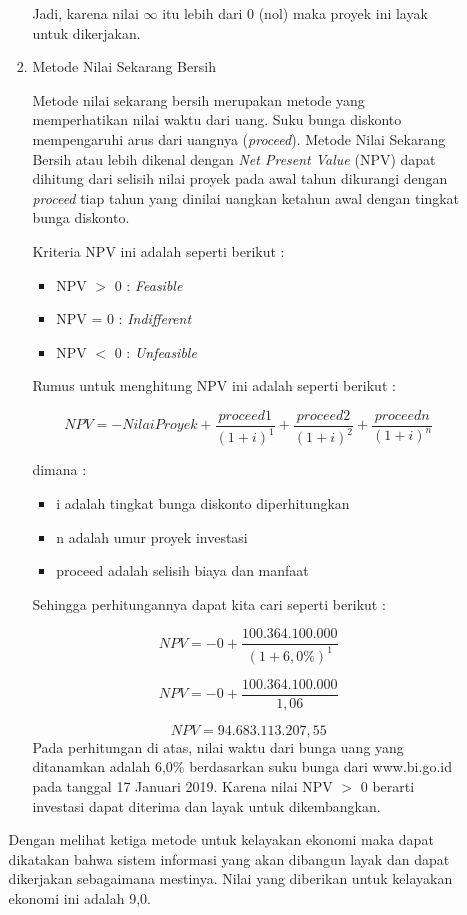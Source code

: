 \documentclass[pdftex,12pt, oneside]{article}
\begin{document}
\begin{enumerate}
\begin{enumerate}
\begin{enumerate}
Jadi, karena nilai $ \infty $ itu lebih dari 0 (nol) maka proyek ini layak untuk dikerjakan.
	
	\item Metode Nilai Sekarang Bersih
	
Metode nilai sekarang bersih merupakan metode yang memperhatikan nilai waktu dari uang. Suku bunga diskonto mempengaruhi arus dari uangnya (\textit{proceed}). Metode Nilai Sekarang Bersih atau lebih dikenal dengan \textit{Net Present Value} (NPV) dapat dihitung dari selisih nilai proyek pada awal tahun dikurangi dengan \textit{proceed} tiap tahun yang dinilai uangkan ketahun awal dengan tingkat bunga diskonto.

Kriteria NPV ini adalah seperti berikut :

\begin{itemize}
	\item NPV $>$ 0 : \textit{Feasible}
	\item NPV = 0 : \textit{Indifferent}
	\item NPV $<$ 0 : \textit{Unfeasible}
\end{itemize}

Rumus untuk menghitung NPV ini adalah seperti berikut :

\[ NPV = - NilaiProyek + \frac{proceed1}{(1 + i)^1} + \frac{proceed2}{(1 + i)^2} + \frac{proceedn}{(1 + i)^n} \]

dimana :

\begin{itemize}
	\item i adalah tingkat bunga diskonto diperhitungkan
	\item n adalah umur proyek investasi
	\item proceed adalah selisih biaya dan manfaat
\end{itemize}

Sehingga perhitungannya dapat kita cari seperti berikut :

\[ NPV = - 0 + \frac{100.364.100.000}{(1 + 6,0\%)^1} \]

\[ NPV = - 0 + \frac{100.364.100.000}{1,06} \]

\[ NPV =  94.683.113.207,55 \]
Pada perhitungan di atas, nilai waktu dari bunga uang yang ditanamkan adalah 6,0\% berdasarkan suku bunga dari www.bi.go.id pada tanggal 17 Januari 2019. Karena nilai NPV $>$ 0 berarti investasi dapat diterima dan layak untuk dikembangkan.
	
\end{enumerate}

Dengan melihat ketiga metode untuk kelayakan ekonomi maka dapat dikatakan bahwa sistem informasi yang akan dibangun layak dan dapat dikerjakan sebagaimana mestinya. Nilai yang diberikan untuk kelayakan ekonomi ini adalah 9,0.
	

\end{enumerate}
\end{enumerate}
\end{document}
